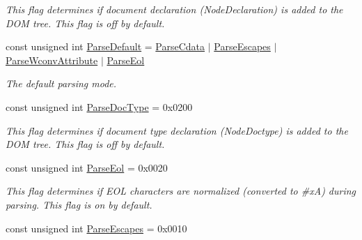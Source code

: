 \begin{DoxyCompactItemize}
\begin{DoxyCompactList}\small\item\em This flag determines if document declaration (NodeDeclaration) is added to the DOM tree. This flag is off by default. \item\end{DoxyCompactList}\item 
const unsigned int \hyperlink{namespacephys_1_1xml_aa6b8f7f8c2322fd683a235b498834d60}{ParseDefault} = \hyperlink{namespacephys_1_1xml_aec00a2a16700dfd76f8f3c776bd000ac}{ParseCdata} $|$ \hyperlink{namespacephys_1_1xml_a6463412ba9e404b6890e4721255cd8ed}{ParseEscapes} $|$ \hyperlink{namespacephys_1_1xml_af9f7575e3cb8a0d8ad9a7ceee5e26983}{ParseWconvAttribute} $|$ \hyperlink{namespacephys_1_1xml_a52af747730d2b3a313eebed4cf49a333}{ParseEol}
\begin{DoxyCompactList}\small\item\em The default parsing mode. \item\end{DoxyCompactList}\item 
\hypertarget{namespacephys_1_1xml_adf5ee79dc4c200ad85b64a8308b0c805}{
const unsigned int \hyperlink{namespacephys_1_1xml_adf5ee79dc4c200ad85b64a8308b0c805}{ParseDocType} = 0x0200}
\label{namespacephys_1_1xml_adf5ee79dc4c200ad85b64a8308b0c805}

\begin{DoxyCompactList}\small\item\em This flag determines if document type declaration (NodeDoctype) is added to the DOM tree. This flag is off by default. \item\end{DoxyCompactList}\item 
\hypertarget{namespacephys_1_1xml_a52af747730d2b3a313eebed4cf49a333}{
const unsigned int \hyperlink{namespacephys_1_1xml_a52af747730d2b3a313eebed4cf49a333}{ParseEol} = 0x0020}
\label{namespacephys_1_1xml_a52af747730d2b3a313eebed4cf49a333}

\begin{DoxyCompactList}\small\item\em This flag determines if EOL characters are normalized (converted to \#xA) during parsing. This flag is on by default. \item\end{DoxyCompactList}\item 
\hypertarget{namespacephys_1_1xml_a6463412ba9e404b6890e4721255cd8ed}{
const unsigned int \hyperlink{namespacephys_1_1xml_a6463412ba9e404b6890e4721255cd8ed}{ParseEscapes} = 0x0010}
\label{namespacephys_1_1xml_a6463412ba9e404b6890e4721255cd8ed}


\end{DoxyCompactItemize}
